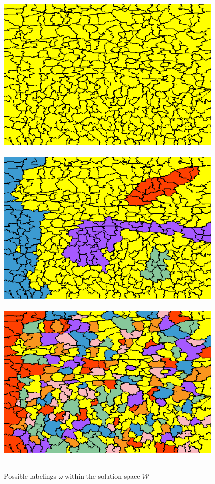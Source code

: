 \begin{frame}
\begin{columns}
\begin{column}{.4\textwidth}
\end{column}
\end{columns}
\begin{figure}[htbp]
\centering
\includegraphics[width=.3\textwidth]{MRFHomogeneous}~
\includegraphics[width=.3\textwidth]{MRFstructure}~
\includegraphics[width=.3\textwidth]{MRFrand}~
\caption{Possible labelings $\omega$ within the solution space $\mathcal{W}$}
\end{figure}
\end{frame}



